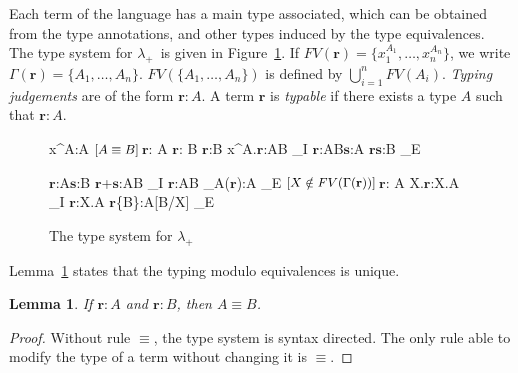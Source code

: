 \documentclass[final,copyright,creativecommons]{eptcs}
\newcommand{\OurCalculus}{\ensuremath{\lambda_+}}
\newcommand{\ve}[1]{\ensuremath{\mathrm{\textbf{#1}}}}
\newcommand{\cond}[1]{\ensuremath{\mbox{\small$[#1]\,$}}}
\newtheorem{lemma}[theorem]{Lemma}
\theoremstyle{definition}
\begin{document}
Each term of the language has a main type associated, which can be obtained from the type annotations, and other types induced by the type equivalences.
The type system for \OurCalculus\ is given in Figure~\ref{fig:typeSys}.
If $FV(\ve r)=\{x_1^{A_1},\dots,x_n^{A_n}\}$, we write $\Gamma(\ve r)=\{A_1,\dots,A_n\}$. $FV(\{A_1,\dots,A_n\})$ is defined by $\bigcup_{i=1}^nFV(A_i)$.
{\em Typing judgements} are of the form $\ve r:A$. A term $\ve r$ is {\em typable} if there exists a type $A$ such that $\ve r:A$.

\begin{figure}[!ht]
\centering\vspace{0.1cm}
\hspace{0.25cm}
  \prooftree
  \justifies x^A:A
  \endprooftree
\hfill
  \cond{A\equiv B}\prooftree\ve r: A
  \justifies\ve r: B
  \using\equiv
  \endprooftree
\hfill
  \prooftree\ve r:B
  \justifies \lambda x^A.\ve r:A\Rightarrow B
  \using\Rightarrow_I
  \endprooftree
\hfill
  \prooftree\ve r:A\Rightarrow B\quad \ve s:A
  \justifies\ve r\ve s:B
  \using\Rightarrow_E
  \endprooftree\hspace{0.10cm}
\vspace{0.5cm}

\hspace{0.25cm}
  \prooftree\ve r:A\quad \ve s:B
  \justifies\ve r+\ve s:A\wedge B
  \using\wedge_I
  \endprooftree
\hfill
  \prooftree\ve r:A\wedge B
  \justifies\pi_A(\ve r):A
  \using\wedge_E
  \endprooftree
\hfill
  \cond{X\notin FV(\Gamma(\ve r))}\prooftree\ve r: A
  \justifies\Lambda X.\ve r:\forall X.A
  \using\forall_I
  \endprooftree
\hfill
  \prooftree\ve r:\forall X.A
  \justifies\ve r\{B\}:A[B/X]
  \using\forall_E
  \endprooftree\hspace{0.10cm}

\vspace{0.1cm}
  \caption{The type system for \OurCalculus}
  \label{fig:typeSys}
\end{figure}

Lemma~\ref{lem:unicity} states that the typing modulo equivalences is unique.
\begin{lemma}\label{lem:unicity}
 If $\ve r:A$ and $\ve r:B$, then $A\equiv B$.
\end{lemma}
\begin{proof}
  Without rule $\equiv$, the type system is syntax directed. The only rule able to modify the type of a term without changing it is $\equiv$.
\end{proof}
\end{document}
